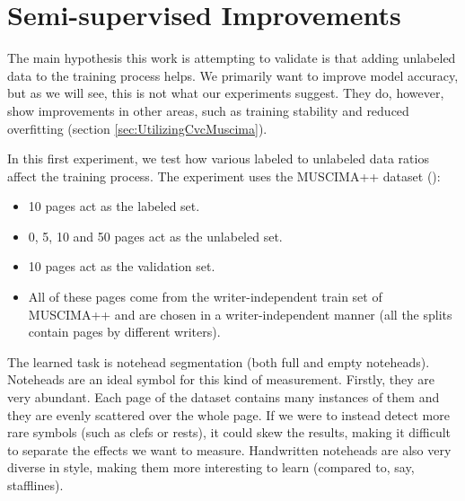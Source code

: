 \section{Semi-supervised Improvements}
\label{sec:SemisupervisedImprovements}

The main hypothesis this work is attempting to validate is that adding unlabeled data to the training process helps. We primarily want to improve model accuracy, but as we will see, this is not what our experiments suggest. They do, however, show improvements in other areas, such as training stability and reduced overfitting (section \ref{sec:UtilizingCvcMuscima}).

In this first experiment, we test how various labeled to unlabeled data ratios affect the training process. The experiment uses the MUSCIMA++ dataset (\cite{MuscimaPP}):

\begin{itemize}
    \item 10 pages act as the labeled set.
    \item 0, 5, 10 and 50 pages act as the unlabeled set.
    \item 10 pages act as the validation set.
    \item All of these pages come from the writer-independent train set of MUSCIMA++ and are chosen in a writer-independent manner (all the splits contain pages by different writers).
\end{itemize}

The learned task is notehead segmentation (both full and empty noteheads). Noteheads are an ideal symbol for this kind of measurement. Firstly, they are very abundant. Each page of the dataset contains many instances of them and they are evenly scattered over the whole page. If we were to instead detect more rare symbols (such as clefs or rests), it could skew the results, making it difficult to separate the effects we want to measure. Handwritten noteheads are also very diverse in style, making them more interesting to learn (compared to, say, stafflines).

